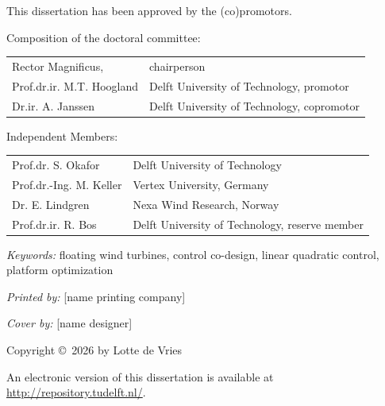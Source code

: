 \thispagestyle{empty}
\noindent This dissertation has been approved by the (co)promotors.\par
\vspace{1em}
\noindent Composition of the doctoral committee:\par
\vspace{0.5em}
\noindent\begin{tabularx}{\linewidth}{@{}lX@{}}
Rector Magnificus, & chairperson\\
Prof.dr.ir. M.T. Hoogland & Delft University of Technology, promotor\\
Dr.ir. A. Janssen & Delft University of Technology, copromotor\\
\end{tabularx}\par
\vspace{0.5em}
\noindent Independent Members:\par
\noindent\begin{tabularx}{\linewidth}{@{}lX@{}}
Prof.dr. S. Okafor & Delft University of Technology\\
Prof.dr.-Ing. M. Keller & Vertex University, Germany\\
Dr. E. Lindgren & Nexa Wind Research, Norway\\
Prof.dr.ir. R. Bos & Delft University of Technology, reserve member\\
\end{tabularx}\par
\vspace{2em}
\noindent\textit{Keywords:} floating wind turbines, control co-design, linear quadratic control, platform optimization\par
\noindent\textit{Printed by:} [name printing company]\par
\noindent\textit{Cover by:} [name designer]\par
\vspace{1em}
\noindent Copyright \copyright\ 2026 by Lotte de Vries\par
\vspace{1em}
\noindent An electronic version of this dissertation is available at\\
\url{http://repository.tudelft.nl/}.
\clearpage
